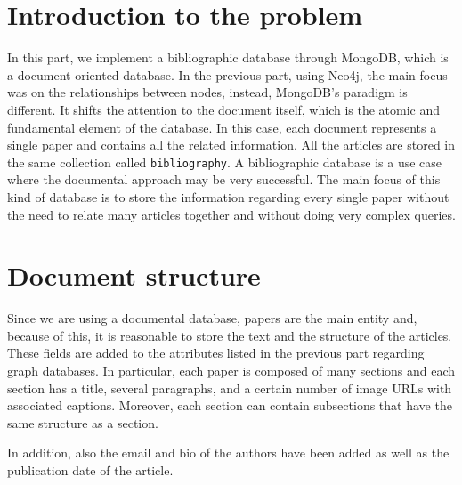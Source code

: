 \chapter{Introduction to the problem}
\label{ch:introduction_to_the_problem_mongodb}%
In this part, we implement a bibliographic database through MongoDB, which is a document-oriented database.
In the previous part, using Neo4j, the main focus was on the relationships between nodes, instead, MongoDB's paradigm is different.
It shifts the attention to the document itself, which is the atomic and fundamental element of the database.
In this case, each document represents a single paper and contains all the related information.
All the articles are stored in the same collection called \verb|bibliography|.
A bibliographic database is a use case where the documental approach may be very successful.
The main focus of this kind of database is to store the information regarding every single paper without the need to relate many articles together and without doing very complex queries.


\chapter{Document structure}
\label{ch:document_structure_mongodb}%
Since we are using a documental database, papers are the main entity and, because of this, it is reasonable to store the text and the structure of the articles.
These fields are added to the attributes listed in the previous part regarding graph databases.
In particular, each paper is composed of many sections and each section has a title, several paragraphs, and a certain number of image URLs with associated captions.
Moreover, each section can contain subsections that have the same structure as a section.

In addition, also the email and bio of the authors have been added as well as the publication date of the article.

